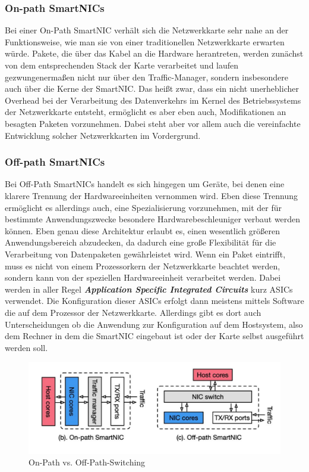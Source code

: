 \subsubsection{On-path SmartNICs}
Bei einer On-Path SmartNIC verhält sich die Netzwerkkarte sehr nahe an der Funktionsweise, wie man sie von einer traditionellen Netzwerkkarte erwarten würde. Pakete, die über das Kabel an die Hardware herantreten, werden zunächst von dem entsprechenden Stack der Karte verarbeitet und laufen gezwungenermaßen nicht nur über den Traffic-Manager, sondern insbesondere auch über die Kerne der SmartNIC. Das heißt zwar, dass ein nicht unerheblicher Overhead bei der Verarbeitung des Datenverkehrs im Kernel des Betriebssystems der Netzwerkkarte entsteht, ermöglicht es aber eben auch, Modifikationen an besagten Paketen vorzunehmen. Dabei steht aber vor allem auch die vereinfachte Entwicklung solcher Netzwerkkarten im Vordergrund.
\subsubsection{Off-path SmartNICs}
Bei Off-Path SmartNICs handelt es sich hingegen um Geräte, bei denen eine klarere Trennung der Hardwareeinheiten vernommen wird. Eben diese Trennung ermöglicht es allerdings auch, eine Spezialisierung vorzunehmen, mit der für bestimmte Anwendungszwecke besondere Hardwarebeschleuniger verbaut werden können. Eben genau diese Architektur erlaubt es, einen wesentlich größeren Anwendungsbereich abzudecken, da dadurch eine große Flexibilität für die Verarbeitung von Datenpaketen gewährleistet wird. Wenn ein Paket eintrifft, muss es nicht von einem Prozessorkern der Netzwerkkarte beachtet werden, sondern kann von der speziellen Hardwareeinheit verarbeitet werden. Dabei werden in aller Regel \textbf{\textit{Application Specific Integrated Circuits}} kurz ASICs verwendet. Die Konfiguration dieser ASICs erfolgt dann meistens mittels Software die auf dem Prozessor der Netzwerkkarte. Allerdings gibt es dort auch Unterscheidungen ob die Anwendung zur Konfiguration auf dem Hostsystem, also dem Rechner in dem die SmartNIC eingebaut ist oder der Karte selbst ausgeführt werden soll. 
\begin{figure}
    \centering
    \includegraphics[width=0.9\linewidth]{images/Screenshot 2025-03-16 at 10-41-14 Netdev 0x14 -- Taking Control of your SmartNIC v1.pdf.png}
    \caption{On-Path vs. Off-Path-Switching}
    \label{fig:enter-label}
\end{figure}
